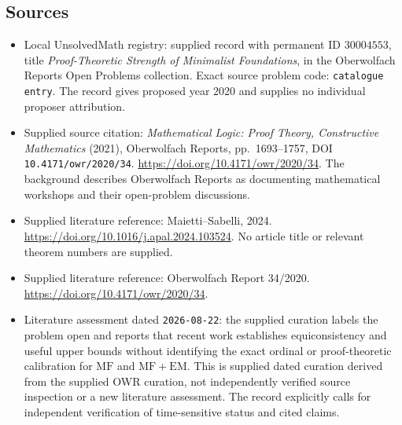 \documentclass[11pt]{article}
\begin{document}
\subsection{Sources}
\begin{itemize}
\item Local UnsolvedMath registry: supplied record with permanent ID \(30004553\), title \emph{Proof-Theoretic Strength of Minimalist Foundations}, in the Oberwolfach Reports Open Problems collection. Exact source problem code: \texttt{catalogue entry}. The record gives proposed year 2020 and supplies no individual proposer attribution.
\item Supplied source citation: \emph{Mathematical Logic: Proof Theory, Constructive Mathematics} (2021), Oberwolfach Reports, pp.\ 1693--1757, DOI \texttt{10.4171/owr/2020/34}. \url{https://doi.org/10.4171/owr/2020/34}. The background describes Oberwolfach Reports as documenting mathematical workshops and their open-problem discussions.
\item Supplied literature reference: Maietti--Sabelli, 2024. \url{https://doi.org/10.1016/j.apal.2024.103524}. No article title or relevant theorem numbers are supplied.
\item Supplied literature reference: Oberwolfach Report 34/2020. \url{https://doi.org/10.4171/owr/2020/34}.
\item Literature assessment dated \texttt{2026-08-22}: the supplied curation labels the problem open and reports that recent work establishes equiconsistency and useful upper bounds without identifying the exact ordinal or proof-theoretic calibration for \(\mathrm{MF}\) and \(\mathrm{MF}+\mathrm{EM}\). This is supplied dated curation derived from the supplied OWR curation, not independently verified source inspection or a new literature assessment. The record explicitly calls for independent verification of time-sensitive status and cited claims.
\end{itemize}
\end{document}

